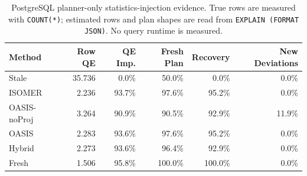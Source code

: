 \begin{table}[t]
  \centering
  \small
  \caption{PostgreSQL planner-only statistics-injection evidence. True rows are measured with \texttt{COUNT(*)}; estimated rows and plan shapes are read from \texttt{EXPLAIN (FORMAT JSON)}. No query runtime is measured.}
  \label{tab:postgres_planner_stats_injection}
  \setlength{\tabcolsep}{4pt}
  \begin{tabular}{lrrrrr}
    \toprule
    Method & Row QE & QE Imp. & Fresh Plan & Recovery & New Deviations \\
    \midrule
    Stale & 35.736 & 0.0\% & 50.0\% & 0.0\% & 0.0\% \\
    ISOMER & 2.236 & 93.7\% & 97.6\% & 95.2\% & 0.0\% \\
    OASIS-noProj & 3.264 & 90.9\% & 90.5\% & 92.9\% & 11.9\% \\
    OASIS & 2.283 & 93.6\% & 97.6\% & 95.2\% & 0.0\% \\
    Hybrid & 2.273 & 93.6\% & 96.4\% & 92.9\% & 0.0\% \\
    Fresh & 1.506 & 95.8\% & 100.0\% & 100.0\% & 0.0\% \\
    \bottomrule
  \end{tabular}
\end{table}
